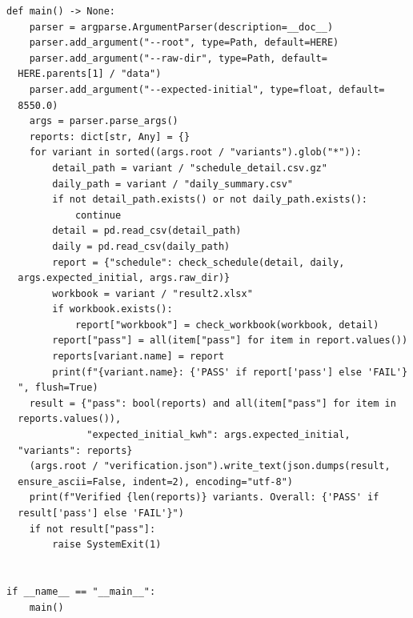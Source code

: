 \begin{verbatim}
def main() -> None:
    parser = argparse.ArgumentParser(description=__doc__)
    parser.add_argument("--root", type=Path, default=HERE)
    parser.add_argument("--raw-dir", type=Path, default=
  HERE.parents[1] / "data")
    parser.add_argument("--expected-initial", type=float, default=
  8550.0)
    args = parser.parse_args()
    reports: dict[str, Any] = {}
    for variant in sorted((args.root / "variants").glob("*")):
        detail_path = variant / "schedule_detail.csv.gz"
        daily_path = variant / "daily_summary.csv"
        if not detail_path.exists() or not daily_path.exists():
            continue
        detail = pd.read_csv(detail_path)
        daily = pd.read_csv(daily_path)
        report = {"schedule": check_schedule(detail, daily,
  args.expected_initial, args.raw_dir)}
        workbook = variant / "result2.xlsx"
        if workbook.exists():
            report["workbook"] = check_workbook(workbook, detail)
        report["pass"] = all(item["pass"] for item in report.values())
        reports[variant.name] = report
        print(f"{variant.name}: {'PASS' if report['pass'] else 'FAIL'}
  ", flush=True)
    result = {"pass": bool(reports) and all(item["pass"] for item in
  reports.values()),
              "expected_initial_kwh": args.expected_initial,
  "variants": reports}
    (args.root / "verification.json").write_text(json.dumps(result,
  ensure_ascii=False, indent=2), encoding="utf-8")
    print(f"Verified {len(reports)} variants. Overall: {'PASS' if
  result['pass'] else 'FAIL'}")
    if not result["pass"]:
        raise SystemExit(1)


if __name__ == "__main__":
    main()
\end{verbatim}

